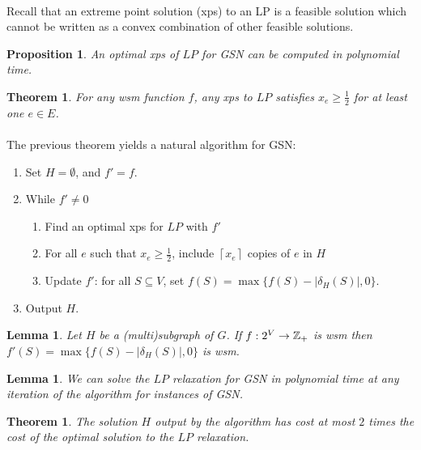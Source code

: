\documentclass[letterpaper,12pt,oneside,onecolumn]{article}
\newtheorem{lemma}[fact]{Lemma}
\newtheorem{theorem}[fact]{Theorem}
\newtheorem{proposition}[fact]{Proposition}
\newcommand{\ceil}[1]{\ensuremath{\left\lceil#1\right\rceil}}
\begin{document}
\paragraph{}
Recall that an extreme point solution (xps) to an LP is a feasible solution which cannot be written as a convex combination of other feasible solutions.
\begin{proposition}
An optimal xps of $LP$ for GSN can be computed in polynomial time.
\end{proposition}
\begin{theorem}
For any wsm function $f$, any xps to $LP$ satisfies $x_e \geq \frac{1}{2}$ for at least one $e \in E$.
\end{theorem}
\paragraph{}
The previous theorem yields a natural algorithm for GSN:
\begin{enumerate}
\item Set $H= \emptyset$, and $f' = f$.
\item While $f' \neq 0$
\begin{enumerate}
\item Find an optimal xps for $LP$ with $f'$
\item For all $e$ such that $x_e \geq \frac{1}{2}$, include $\ceil{x_e}$ copies of $e$ in $H$
\item Update $f'$: for all $S\subseteq V$, set $f(S) = \max \{f(S)-|\delta_H(S)|, 0\}$.
\end{enumerate}
\item Output $H$.
\end{enumerate}
\begin{lemma}
Let $H$ be a (multi)subgraph of $G$. If $f: 2^V \rightarrow \mathbb{Z}_+$ is wsm then $f'(S) = \max \{ f(S) - |\delta_H(S)|, 0\}$ is wsm.
\end{lemma}
\begin{lemma}
We can solve the $LP$ relaxation for GSN in polynomial time at any iteration of the algorithm for instances of GSN.
\end{lemma}
\begin{theorem}
The solution $H$ output by the algorithm has cost at most $2$ times the cost of the optimal solution to the $LP$ relaxation.
\end{theorem}
\end{document}
